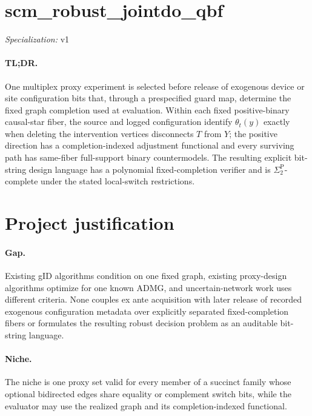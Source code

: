 \documentclass{article}
\begin{document}
\sloppy

\section*{scm\_\allowbreak{}robust\_\allowbreak{}jointdo\_\allowbreak{}qbf}

\noindent\textit{Specialization:} v1\par

\paragraph{TL;DR.} One multiplex proxy experiment is selected before release of exogenous device or site configuration bits that, through a prespecified guard map, determine the fixed graph completion used at evaluation. Within each fixed positive-binary causal-star fiber, the source and logged configuration identify \(\theta_t(y)\) exactly when deleting the intervention vertices disconnects \(T\) from \(Y\); the positive direction has a completion-indexed adjustment functional and every surviving path has same-fiber full-support binary countermodels. The resulting explicit bit-string design language has a polynomial fixed-completion verifier and is \(\Sigma_2^{\mathrm P}\)-complete under the stated local-switch restrictions.

\section{Project justification}

\paragraph{Gap.} Existing gID algorithms condition on one fixed graph, existing proxy-design algorithms optimize for one known ADMG, and uncertain-network work uses different criteria. None couples ex ante acquisition with later release of recorded exogenous configuration metadata over explicitly separated fixed-completion fibers or formulates the resulting robust decision problem as an auditable bit-string language.

\paragraph{Niche.} The niche is one proxy set valid for every member of a succinct family whose optional bidirected edges share equality or complement switch bits, while the evaluator may use the realized graph and its completion-indexed functional.
\end{document}

